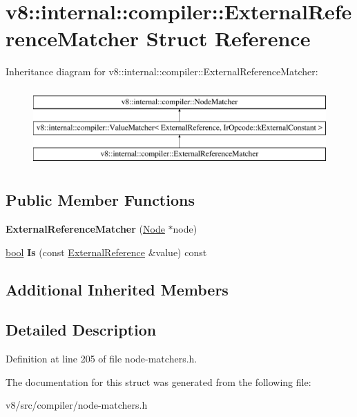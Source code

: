 \hypertarget{structv8_1_1internal_1_1compiler_1_1ExternalReferenceMatcher}{}\section{v8\+:\+:internal\+:\+:compiler\+:\+:External\+Reference\+Matcher Struct Reference}
\label{structv8_1_1internal_1_1compiler_1_1ExternalReferenceMatcher}
Inheritance diagram for v8\+:\+:internal\+:\+:compiler\+:\+:External\+Reference\+Matcher\+:\begin{figure}[H]
\begin{center}
\leavevmode
\includegraphics[height=3.000000cm]{structv8_1_1internal_1_1compiler_1_1ExternalReferenceMatcher}
\end{center}
\end{figure}
\subsection*{Public Member Functions}
\begin{DoxyCompactItemize}
\item 
\mbox{\label{structv8_1_1internal_1_1compiler_1_1ExternalReferenceMatcher_af8d61181c2f48f849215c32c83cc9f9f}} 
{\bfseries External\+Reference\+Matcher} (\mbox{\hyperlink{classv8_1_1internal_1_1compiler_1_1Node}{Node}} $\ast$node)
\item 
\mbox{\label{structv8_1_1internal_1_1compiler_1_1ExternalReferenceMatcher_ada1c38528160f714cc056deb18596a23}} 
\mbox{\hyperlink{classbool}{bool}} {\bfseries Is} (const \mbox{\hyperlink{classv8_1_1internal_1_1ExternalReference}{External\+Reference}} \&value) const
\end{DoxyCompactItemize}
\subsection*{Additional Inherited Members}


\subsection{Detailed Description}


Definition at line 205 of file node-\/matchers.\+h.



The documentation for this struct was generated from the following file\+:\begin{DoxyCompactItemize}
\item 
v8/src/compiler/node-\/matchers.\+h\end{DoxyCompactItemize}
